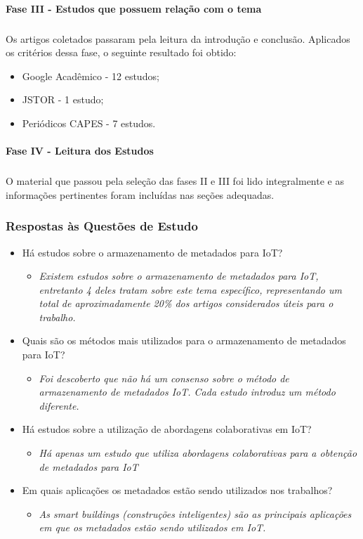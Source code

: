 \paragraph{Fase III - Estudos que possuem relação com o tema}
\subparagraph{}
\quad Os artigos coletados passaram pela leitura da introdução e conclusão.
Aplicados os critérios dessa fase, o seguinte resultado foi obtido:
\begin{itemize}
  \item Google Acadêmico - 12 estudos;
  \item JSTOR - 1 estudo;
  \item Periódicos CAPES - 7 estudos.
\end{itemize}
\paragraph{Fase IV - Leitura dos Estudos}
\subparagraph{}
\quad O material que passou pela seleção das fases II e III foi lido integralmente e as
informações pertinentes foram incluídas nas seções adequadas.
\subsubsection{Respostas às Questões de Estudo}
\begin{itemize}
  \item Há estudos sobre o armazenamento de metadados para \acrlong{IoT}?
 \begin{itemize}
    \item \textit{Existem estudos sobre o armazenamento de metadados para \acrshort{IoT}, entretanto 4 deles tratam
    sobre este tema específico, representando um total de aproximadamente 20\% dos artigos considerados úteis para o trabalho.}
  \end{itemize}
  \item Quais são os métodos mais utilizados para o armazenamento de metadados para \acrshort{IoT}?
    \begin{itemize}
    \item \textit{Foi descoberto que não há um consenso sobre o método de armazenamento de metadados \acrshort{IoT}. Cada estudo introduz um método diferente.}
  \end{itemize}
  \item Há estudos sobre a utilização de abordagens colaborativas em \acrlong{IoT}?
  \begin{itemize}
    \item \textit{Há apenas um estudo que utiliza abordagens colaborativas para a obtenção de metadados para \acrshort{IoT}}
  \end{itemize}
  \item Em quais aplicações os metadados estão sendo utilizados nos trabalhos?
  \begin{itemize}
    \item \textit{As smart buildings (construções inteligentes) são as principais aplicações em que os metadados estão sendo utilizados em \acrshort{IoT}.}
  \end{itemize}
\end{itemize}

